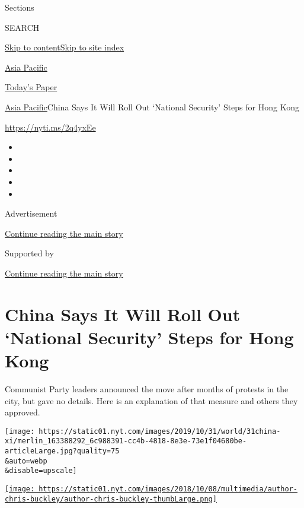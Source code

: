 Sections

SEARCH

\protect\hyperlink{site-content}{Skip to
content}\protect\hyperlink{site-index}{Skip to site index}

\href{https://www.nytimes.com/section/world/asia}{Asia Pacific}

\href{https://myaccount.nytimes.com/auth/login?response_type=cookie\&client_id=vi}{}

\href{https://www.nytimes.com/section/todayspaper}{Today's Paper}

\href{/section/world/asia}{Asia Pacific}\textbar{}China Says It Will
Roll Out `National Security' Steps for Hong Kong

\url{https://nyti.ms/2q4yxEe}

\begin{itemize}
\item
\item
\item
\item
\item
\end{itemize}

Advertisement

\protect\hyperlink{after-top}{Continue reading the main story}

Supported by

\protect\hyperlink{after-sponsor}{Continue reading the main story}

\hypertarget{china-says-it-will-roll-out-national-security-steps-for-hong-kong}{%
\section{China Says It Will Roll Out `National Security' Steps for Hong
Kong}\label{china-says-it-will-roll-out-national-security-steps-for-hong-kong}}

Communist Party leaders announced the move after months of protests in
the city, but gave no details. Here is an explanation of that measure
and others they approved.

\texttt{[image: https://static01.nyt.com/images/2019/10/31/world/31china-xi/merlin\_163388292\_6c988391-cc4b-4818-8e3e-73e1f04680be-articleLarge.jpg?quality=75\\\&auto=webp\\\&disable=upscale]}

\href{https://www.nytimes.com/by/chris-buckley}{\texttt{[image: https://static01.nyt.com/images/2018/10/08/multimedia/author-chris-buckley/author-chris-buckley-thumbLarge.png]}}

